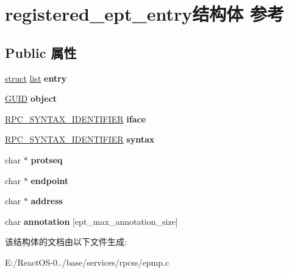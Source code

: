 \hypertarget{structregistered__ept__entry}{}\section{registered\+\_\+ept\+\_\+entry结构体 参考}
\label{structregistered__ept__entry}
\subsection*{Public 属性}
\begin{DoxyCompactItemize}
\item 
\mbox{\label{structregistered__ept__entry_aa0067d00cc622f165054439a8f5b26b4}} 
\hyperlink{interfacestruct}{struct} \hyperlink{classlist}{list} {\bfseries entry}
\item 
\mbox{\label{structregistered__ept__entry_aa5b555c12a6734ae5a271370541e46e8}} 
\hyperlink{interface_g_u_i_d}{G\+U\+ID} {\bfseries object}
\item 
\mbox{\label{structregistered__ept__entry_a8966b788ae7b951cea1cce7e1ceee4a1}} 
\hyperlink{struct___r_p_c___s_y_n_t_a_x___i_d_e_n_t_i_f_i_e_r}{R\+P\+C\+\_\+\+S\+Y\+N\+T\+A\+X\+\_\+\+I\+D\+E\+N\+T\+I\+F\+I\+ER} {\bfseries iface}
\item 
\mbox{\label{structregistered__ept__entry_adfed2c7f90d57099e0cffb955237cb62}} 
\hyperlink{struct___r_p_c___s_y_n_t_a_x___i_d_e_n_t_i_f_i_e_r}{R\+P\+C\+\_\+\+S\+Y\+N\+T\+A\+X\+\_\+\+I\+D\+E\+N\+T\+I\+F\+I\+ER} {\bfseries syntax}
\item 
\mbox{\label{structregistered__ept__entry_a92f18262d37cc779f238f2f8a55bc78f}} 
char $\ast$ {\bfseries protseq}
\item 
\mbox{\label{structregistered__ept__entry_aac758871e1b45faa3dc76074921f2deb}} 
char $\ast$ {\bfseries endpoint}
\item 
\mbox{\label{structregistered__ept__entry_ac6a5f72ed031920d36989347ff68449a}} 
char $\ast$ {\bfseries address}
\item 
\mbox{\label{structregistered__ept__entry_a538a1b64f7fc5d66b9603cc717999c6b}} 
char {\bfseries annotation} \mbox{[}ept\+\_\+max\+\_\+annotation\+\_\+size\mbox{]}
\end{DoxyCompactItemize}


该结构体的文档由以下文件生成\+:\begin{DoxyCompactItemize}
\item 
E\+:/\+React\+O\+S-\/0../base/services/rpcss/epmp.\+c\end{DoxyCompactItemize}
